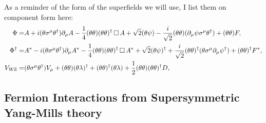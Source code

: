 \documentclass[../main.tex]{subfiles}
\begin{document}
\begin{temporary}
  As a reminder of the form of the superfields we will use, I list them on component form here:
  \begin{subequations}
    \begin{align}
      \Phi =         & A + i(\theta\sigma^\mu\theta^\dagger) \partial_\mu A - \frac{1}{4} (\theta\theta)(\theta\theta)^\dagger \operatorname{\Box} A +
      \sqrt{2} (\theta\psi) - \frac{i}{\sqrt{2}} (\theta\theta) (\partial_\mu \psi \sigma^\mu \theta^\dagger) + (\theta\theta) F,                     \\
      \Phi^\dag =    & A^\ast - i(\theta\sigma^\mu\theta^\dagger) \partial_\mu A^\ast - \frac{1}{4} (\theta\theta)(\theta\theta)^\dagger \operatorname{\Box} A^\ast +
      \sqrt{2} (\theta\psi)^\dagger + \frac{i}{\sqrt{2}} (\theta\theta)^\dagger
      (\theta \sigma^\mu \partial_\mu \psi^\dagger) + (\theta\theta)^\dagger F^\ast,                                                                  \\
      {V}_\text{WZ} = & (\theta\sigma^\mu\theta^\dagger) V_\mu + (\theta\theta) (\theta\lambda)^\dagger +
      (\theta\theta)^\dagger(\theta\lambda) + \frac{1}{2}
      (\theta\theta)(\theta\theta)^\dagger D,
    \end{align}
  \end{subequations}
\end{temporary}

\subsection{Fermion Interactions from Supersymmetric Yang-Mills theory}
\end{document}
